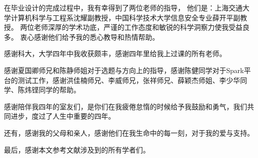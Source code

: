 \begin{acknowledgements}

在毕业设计的完成过程中，我有幸得到了两位老师的指导，
他们是：上海交通大学计算机科学与工程系沈耀副教授，中国科学技术大学信息安全专业薛开平副教授。
两位老师深厚的学术功底，严谨的工作态度和敏锐的科学洞察力使我受益良多。
衷心感谢他们给予我的悉心教导和热情帮助。

感谢科大，大学四年中我收获颇丰，感谢四年里给我上过课的所有老师。

感谢夏国卿师兄和陈静师姐对于选题与方向上的指导，感谢陈健同学对于Spark平台的测试工作，感谢洪佳楠师兄、李威师兄，张祥师兄、薛颖杰师姐、李少华同学、陈炜铿同学的帮助。

感谢陪伴我四年的室友们，是你们在我疲倦怠惰的时候给予我鼓励和勇气，我们共同进步，度过了人生中重要的四年。

还有，感谢我的父母和亲人，感谢他们在我生命中的每一刻，对于我的爱与支持。

最后，感谢本文参考文献涉及到的所有学者们。

\end{acknowledgements}
